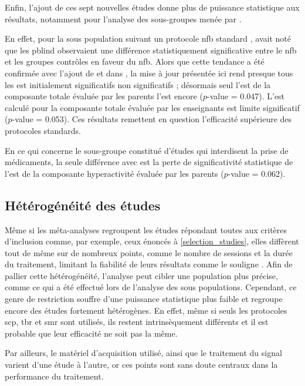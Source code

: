 Enfin, l'ajout de ces sept nouvelles études donne plus de puissance statistique aux résultats, notamment pour l'analyse des sous-groupes menée par \citet{Cortese2016}.

En effet, pour la sous population suivant un protocole \gls{nfb} standard \citep{Arns2014}, \citet{Cortese2016} avait noté que les \gls{pblind} observaient
une différence statistiquement significative entre le \gls{nfb} et les groupes contrôles en faveur du \gls{nfb}. Alors que cette tendance a été confirmée avec l'ajout 
de \citet{Baumeister2016} et \citet{Strehl2017} dans \citet{Bussalb2019clinical}, la mise à jour présentée ici rend presque tous les \gls{est} initialement significatifs 
non significatifs ; désormais seul l'\gls{est} de la composante totale évaluée par les parents l'est encore ($p$-value = 0.047). 
L'\gls{est} calculé pour la composante totale évaluée par les enseignants est limite significatif ($p$-value = 0.053). Ces résultats remettent en question l'efficacité
supérieure des protocoles standards.

En ce qui concerne le sous-groupe constitué d'études qui interdisent la prise de médicaments, la seule différence avec \citep{Cortese2016} est la perte de   
significativité statistique de l'\gls{est} de la composante hyperactivité évaluée par les parents ($p$-value = 0.062).

\subsection{Hétérogénéité des études} 

Même si les méta-analyses regroupent les études répondant toutes aux critères d'inclusion comme, par exemple, ceux énoncés à \ref{selection_studies}, 
elles diffèrent tout de même sur de nombreux points, comme le nombre de sessions et la durée du traitement, limitant la fiabilité de leurs résultats 
comme le souligne \citep{Alkoby2017}. Afin de pallier 
cette hétérogénéité, l'analyse peut cibler une population plus précise, comme ce qui a été effectué lors de l'analyse
des sous populations. Cependant, ce genre de restriction souffre d'une puissance statistique plus faible et regroupe encore des études fortement hétérogènes.
En effet, même si seuls les protocoles \gls{scp}, \gls{tbr} et \gls{smr} sont utilisés, ils restent intrinsèquement différents et il est probable que leur
efficacité ne soit pas la même. 

Par ailleurs, le matériel d'acquisition utilisé, ainsi que le traitement du signal varient d'une étude à l'autre, or ces points sont sans doute centraux 
dans la performance du traitement. 

